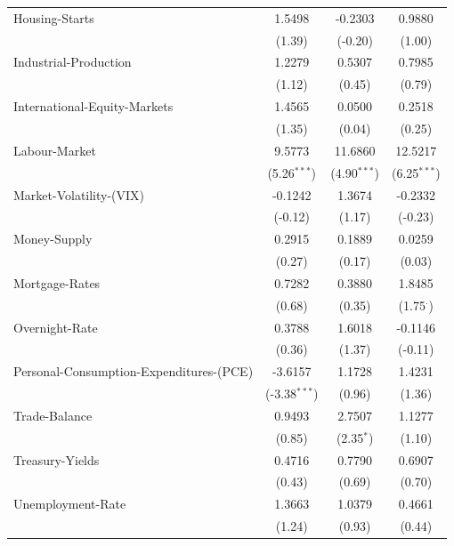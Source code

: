\begin{tabular}{lccc}
Housing-Starts & 1.5498 & -0.2303 & 0.9880 \\
 & (1.39) & (-0.20) & (1.00) \\
Industrial-Production & 1.2279 & 0.5307 & 0.7985 \\
 & (1.12) & (0.45) & (0.79) \\
International-Equity-Markets & 1.4565 & 0.0500 & 0.2518 \\
 & (1.35) & (0.04) & (0.25) \\
Labour-Market & 9.5773 & 11.6860 & 12.5217 \\
 & (5.26$^{***}$) & (4.90$^{***}$) & (6.25$^{***}$) \\
Market-Volatility-(VIX) & -0.1242 & 1.3674 & -0.2332 \\
 & (-0.12) & (1.17) & (-0.23) \\
Money-Supply & 0.2915 & 0.1889 & 0.0259 \\
 & (0.27) & (0.17) & (0.03) \\
Mortgage-Rates & 0.7282 & 0.3880 & 1.8485 \\
 & (0.68) & (0.35) & (1.75$^{\cdot}$) \\
Overnight-Rate & 0.3788 & 1.6018 & -0.1146 \\
 & (0.36) & (1.37) & (-0.11) \\
Personal-Consumption-Expenditures-(PCE) & -3.6157 & 1.1728 & 1.4231 \\
 & (-3.38$^{***}$) & (0.96) & (1.36) \\
Trade-Balance & 0.9493 & 2.7507 & 1.1277 \\
 & (0.85) & (2.35$^{*}$) & (1.10) \\
Treasury-Yields & 0.4716 & 0.7790 & 0.6907 \\
 & (0.43) & (0.69) & (0.70) \\
Unemployment-Rate & 1.3663 & 1.0379 & 0.4661 \\
 & (1.24) & (0.93) & (0.44) \\
\hline
\end{tabular}